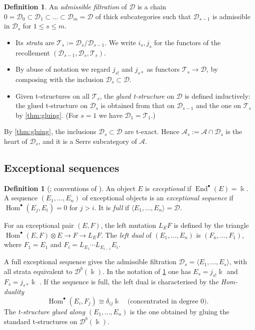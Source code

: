 \documentclass[11pt,reqno]{amsart}
\theoremstyle{plain}
\theoremstyle{definition}
\newtheorem{definition}[theorem]{Definition}
\theoremstyle{remark}
\newcommand{\kk}{\Bbbk}
\DeclareMathOperator{\Hom}{Hom}
\DeclareMathOperator{\End}{End}
\newcommand{\Db}{\mathcal{D}^b}
\newcommand{\thick}[1]{\langle #1\rangle}
\newcommand{\cD}{\mathcal{D}}
\newcommand{\cA}{\mathcal{A}}
\newcommand{\cT}{\mathcal{T}}
\begin{document}
\begin{definition}\label{def:adm-filtration}
An \emph{admissible filtration} of $\cD$ is a chain $0=\cD_0\subset\cD_1\subset\dots\subset\cD_m=\cD$ of thick subcategories such that $\cD_{s-1}$ is admissible in $\cD_s$ for $1\le s\le m$.
\begin{itemize}
\item Its \emph{strata} are $\cT_s:=\cD_s/\cD_{s-1}$. We write $i_s,j_s$ for the functors of the recollement $(\cD_{s-1},\cD_s,\cT_s)$.
\item By abuse of notation we regard $j_{s!}$ and $j_{s*}$ as functors $\cT_s\to\cD$, by composing with the inclusion $\cD_s\subset\cD$.
\item Given t-structures on all $\cT_s$, the \emph{glued t-structure} on $\cD$ is defined inductively: the glued t-structure on $\cD_s$ is obtained from that on $\cD_{s-1}$ and the one on $\cT_s$ by \cref{thm:gluing}. (For $s=1$ we have $\cD_1=\cT_1$.)
\end{itemize}
By \cref{thm:gluing}, the inclusions $\cD_{s}\subset\cD$ are t-exact. Hence $\cA_s:=\cA\cap\cD_s$ is the heart of $\cD_s$, and it is a Serre subcategory of $\cA$.
\end{definition}

\subsection{Exceptional sequences}

\begin{definition}[{\cite{Bon89}; conventions of \cite{BB26}}]
An object $E$ is \emph{exceptional} if $\End^\bullet(E)=\kk$. A sequence $(E_1,\dots,E_n)$ of exceptional objects is an \emph{exceptional sequence} if $\Hom^\bullet(E_j,E_i)=0$ for $j>i$. It is \emph{full} if $\thick{E_1,\dots,E_n}=\cD$.

For an exceptional pair $(E,F)$, the left mutation $L_EF$ is defined by the triangle $\Hom^\bullet(E,F)\otimes E\to F\to L_EF$. The \emph{left dual} of $(E_1,\dots,E_n)$ is $(F_n,\dots,F_1)$, where $F_1=E_1$ and $F_i=L_{E_1}\cdots L_{E_{i-1}}E_i$.
\end{definition}

A full exceptional sequence gives the admissible filtration $\cD_s=\thick{E_1,\dots,E_s}$, with all strata equivalent to $\Db(\kk)$. In the notation of \cref{def:adm-filtration} one has $E_s=j_{s!}\kk$ and $F_s=j_{s*}\kk$ \cite[\S2.4]{BB26}. If the sequence is full, the left dual is characterised by the \emph{Hom-duality}
\begin{equation}\label{eq:hom-duality-exc}
\Hom^\bullet(E_i,F_j)\cong\delta_{ij}\kk\quad\text{(concentrated in degree $0$)}.
\end{equation}
The \emph{t-structure glued along $(E_1,\dots,E_n)$} is the one obtained by gluing the standard t-structures on $\Db(\kk)$.
\end{document}

